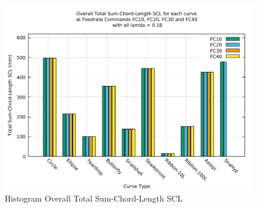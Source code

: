 \clearpage
\pagebreak
\begin{landscape}
	
\begin{figure}
\centering
\caption  {Histogram Overall Total Sum-Chord-Length SCL}
\label{img-Histogram Overall Total Sum-Chord-Length SCL}
\includegraphics[width=1.30\textwidth]{Chap4/Overall/Histogram/SCL-img-Histo-Overall-Total-Sum-Chord-Length.pdf} 
\end{figure}
	
\end{landscape}

